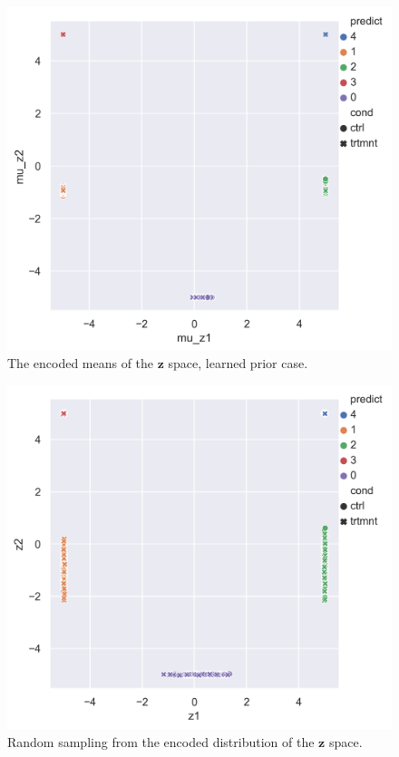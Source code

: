 \documentclass[11pt, a4paper]{report}
\theoremstyle{plain}
\theoremstyle{definition}
\theoremstyle{remark}
\newcommand{\z}{\mathbf{z}}
\begin{document}
\begin{figure}[h]
\centering
\includegraphics[width=1.1\textwidth]{images/blobs_cgmvae_learnedprior_mu_z.png}
\caption{The encoded means of the $\z$ space, learned prior case.
}
\label{fig:blobs_lp_muz}
\end{figure}

\begin{figure}[h]
\centering
\includegraphics[width=1.1\textwidth]{images/blobs_cgmvae_learnedprior_z.png}
\caption{Random sampling from the encoded distribution of the $\z$ space. 
}
\label{fig:blobs_lp_z}
\end{figure}
\end{document}
